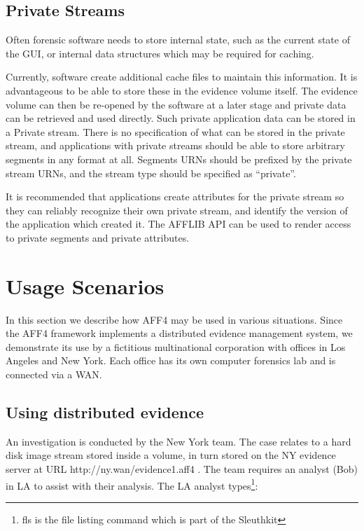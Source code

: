 \documentclass[10pt, conference]{IEEEtran}
\begin{document}
\subsection{Private Streams}
Often forensic software needs to store internal state, such as the
current state of the GUI, or internal data structures which may be
required for caching. 

Currently, software create additional cache files to maintain this
information. It is advantageous to be able to store these in the
evidence volume itself. The evidence volume can then be re-opened by
the software at a later stage and private data can be retrieved and
used directly. Such private application data can be stored in a
Private stream. There is no specification of what can be stored in the
private stream, and applications with private streams should be able
to store arbitrary segments in any format at all. Segments URNs should
be prefixed by the private stream URNs, and the stream type should be
specified as ``private''.

It is recommended that applications create attributes for the private
stream so they can reliably recognize their own private stream, and
identify the version of the application which created it. The AFFLIB
API can be used to render access to private segments and private
attributes.

\section{Usage Scenarios}
In this section we describe how AFF4 may be used in various
situations. Since the AFF4 framework implements a distributed evidence
management system, we demonstrate its use by a fictitious
multinational corporation with offices in Los Angeles and New
York. Each office has its own computer forensics lab and is connected
via a WAN.

\subsection{Using distributed evidence}
An investigation is conducted by the New York team. The case relates
to a hard disk image stream stored inside a volume, in turn stored on
the NY evidence server at URL http://ny.wan/evidence1.aff4 . The team
requires an analyst (Bob) in LA to assist with their analysis. The LA
analyst types\footnote{fls is the file listing command which is part
of the Sleuthkit}:
\end{document}
